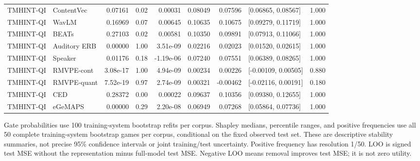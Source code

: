 \begin{longtable}{llrrrrrlr}
TMHINT-QI & ContentVec & 0.07161 & 0.02 & 0.00031 & 0.08049 & 0.07596 & [0.06865, 0.08567] & 1.000 \\
TMHINT-QI & WavLM & 0.16969 & 0.07 & 0.00645 & 0.10635 & 0.10675 & [0.09279, 0.11719] & 1.000 \\
TMHINT-QI & BEATs & 0.27103 & 0.02 & 0.00581 & 0.10350 & 0.09891 & [0.07913, 0.11066] & 1.000 \\
TMHINT-QI & Auditory ERB & 0.00000 & 1.00 & 3.51e-09 & 0.02216 & 0.02023 & [0.01520, 0.02615] & 1.000 \\
TMHINT-QI & Speaker & 0.01176 & 0.18 & -1.19e-06 & 0.07240 & 0.07551 & [0.06389, 0.08265] & 1.000 \\
TMHINT-QI & RMVPE-cont & 3.08e-17 & 1.00 & 4.94e-09 & 0.00234 & 0.00226 & [-0.00109, 0.00505] & 0.880 \\
TMHINT-QI & RMVPE-quant & 7.52e-19 & 0.97 & 2.74e-09 & 0.00321 & -0.00462 & [-0.02116, 0.00191] & 0.180 \\
TMHINT-QI & CED & 0.28372 & 0.00 & 0.00022 & 0.09637 & 0.10356 & [0.09380, 0.12655] & 1.000 \\
TMHINT-QI & eGeMAPS & 0.00000 & 0.29 & 2.20e-08 & 0.06949 & 0.07268 & [0.05864, 0.07736] & 1.000 \\
\end{longtable}
\noindent Gate probabilities use 100 training-system bootstrap refits per corpus. Shapley medians, percentile ranges, and positive frequencies use all 50 complete training-system bootstrap games per corpus, conditional on the fixed observed test set. These are descriptive stability summaries, not precise 95\% confidence intervals or joint training/test uncertainty. Positive frequency has resolution 1/50. LOO is signed test MSE without the representation minus full-model test MSE. Negative LOO means removal improves test MSE; it is not zero utility.
